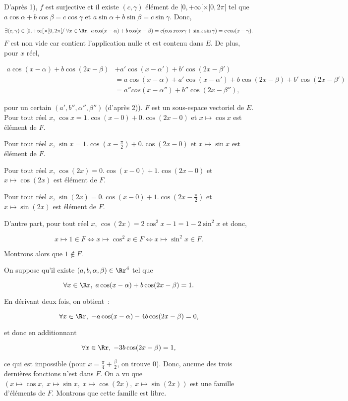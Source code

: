 {\begin{enumerate}
{D'après 1), $f$ est surjective et il existe $(c,\gamma)$ élément de $[0,+\infty[\times[0,2\pi[$ tel que
$a\cos\alpha+b\cos\beta=c\cos\gamma$ et $a\sin\alpha+b\sin\beta=c\sin\gamma$. Donc,

$$\exists(c,\gamma)\in[0,+\infty[\times[0,2\pi[/\;\forall
x\in\Rr,\;a\cos(x-\alpha)+b\cos(x-\beta)=c(\cos xcos\gamma+\sin x\sin\gamma)=c\cos(x-\gamma).$$
$F$ est non vide car contient l'application nulle et est contenu dans $E$. De plus, pour $x$ réel,

\begin{align*}
a\cos(x-\alpha)+b\cos(2x-\beta)&+a'\cos(x-\alpha')+b'\cos(2x-\beta')\\
 &=a\cos(x-\alpha)+a'\cos(x-\alpha')+b\cos(2x-\beta)
+b'\cos(2x-\beta')\\
 &=a''cos(x-\alpha'')+b''\cos(2x-\beta''),
\end{align*}

pour un certain $(a',b'',\alpha'',\beta'')$ (d'après 2)). $F$ est un sous-espace vectoriel de $E$.
Pour tout réel $x$, $\cos x=1.\cos(x-0)+0.\cos(2x-0)$ et $x\mapsto\cos x$ est élément de $F$.

Pour tout réel $x$, $\sin x=1.\cos(x-\frac{\pi}{2})+0.\cos(2x-0)$ et $x\mapsto\sin x$ est élément de $F$.

Pour tout réel $x$, $\cos(2x)=0.\cos(x-0)+1.\cos(2x-0)$ et $x\mapsto\cos(2x)$ est élément de $F$.

Pour tout réel $x$, $\sin(2x)=0.\cos(x-0)+1.\cos(2x-\frac{\pi}{2})$ et $x\mapsto\sin(2x)$ est élément de $F$.

D'autre part, pour tout réel $x$, $\cos(2x)=2\cos^2x-1=1-2\sin^2x$ et donc,

$$x\mapsto1\in F\Leftrightarrow x\mapsto\cos^2x\in F\Leftrightarrow x\mapsto\sin^2x\in F.$$

Montrons alors que $1\notin F$.

On suppose qu'il existe $(a,b,\alpha,\beta)\in\Rr^4$ tel que

$$\forall x\in\Rr,\;a\cos(x-\alpha)+b\cos(2x-\beta)=1.$$

En dérivant deux fois, on obtient~:

$$\forall x\in\Rr,\;-a\cos(x-\alpha)-4b\cos(2x-\beta)=0,$$

et donc en additionnant

$$\forall x\in\Rr,\;-3b\cos(2x-\beta)=1,$$

ce qui est impossible (pour $x=\frac{\pi}{4}+\frac{\beta}{2}$, on trouve $0$). Donc, aucune des trois
dernières fonctions n'est dans $F$.
On a vu que $(x\mapsto\cos x,\;x\mapsto\sin x,\;x\mapsto\cos(2x),\;x\mapsto\sin(2x))$ est une famille
d'éléments de $F$. Montrons que cette famille est libre.

}
\end{enumerate}}
